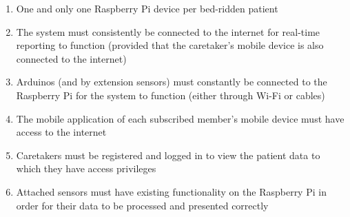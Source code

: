 \begin{enumerate}
\item{One and only one Raspberry Pi device per bed-ridden patient}
\item{The system must consistently be connected to the internet for real-time reporting to function (provided that the caretaker's
mobile device is also connected to the internet)}
\item{Arduinos (and by extension sensors) must constantly be connected to the Raspberry Pi for the system to function (either through Wi-Fi
or cables)}
\item{The mobile application of each subscribed member's mobile device must have access to the internet} 
\item{Caretakers must be registered and logged in to view the patient data to which they have access privileges}
\item{Attached sensors must have existing functionality on the Raspberry Pi in order for their data to be processed and presented correctly}
\end{enumerate}
